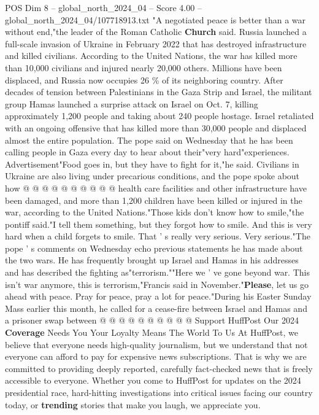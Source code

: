 \begin{textsample}{POS Dim 8 – global\_north\_2024\_04 – Score 4.00 – global\_north\_2024\_04/107718913.txt}  \label{ex:f8_pos_312}
"A negotiated peace is better than a war without end,"the leader of the Roman Catholic \textbf{Church} said.
Russia launched a full-scale invasion of Ukraine in February 2022 that has destroyed infrastructure and killed civilians.
According to the United Nations, the war has killed more than 10,000 civilians and injured nearly 20,000 others.
Millions have been displaced, and Russia now occupies 26 \% of its neighboring country.
After decades of tension between Palestinians in the Gaza Strip and Israel, the militant group Hamas launched a surprise attack on Israel on Oct. 7, killing approximately 1,200 people and taking about 240 people hostage.
Israel retaliated with an ongoing offensive that has killed more than 30,000 people and displaced almost the entire population.
The pope said on Wednesday that he has been calling people in Gaza every day to hear about their"very hard"experiences.
Advertisement"Food goes in, but they have to fight for it,"he said.
Civilians in Ukraine are also living under precarious conditions, and the pope spoke about how @ @ @ @ @ @ @ @ @ @ health care facilities and other infrastructure have been damaged, and more than 1,200 children have been killed or injured in the war, according to the United Nations."Those kids don't know how to smile,"the pontiff said."I tell them something, but they forgot how to smile.
And this is very hard when a child forgets to smile.
That ' s really very serious.
Very serious."The pope ' s comments on Wednesday echo previous statements he has made about the two wars.
He has frequently brought up Israel and Hamas in his addresses and has described the fighting as"terrorism.""Here we ' ve gone beyond war.
This isn't war anymore, this is terrorism,"Francis said in November."\textbf{Please}, let us go ahead with peace.
Pray for peace, pray a lot for peace."During his Easter Sunday Mass earlier this month, he called for a cease-fire between Israel and Hamas and a prisoner swap between @ @ @ @ @ @ @ @ @ @ Support HuffPost Our 2024 \textbf{Coverage} Needs You Your Loyalty Means The World To Us At HuffPost, we believe that everyone needs high-quality journalism, but we understand that not everyone can afford to pay for expensive news subscriptions.
That is why we are committed to providing deeply reported, carefully fact-checked news that is freely accessible to everyone.
Whether you come to HuffPost for updates on the 2024 presidential race, hard-hitting investigations into critical issues facing our country today, or \textbf{trending} stories that make you laugh, we appreciate you.

\end{textsample}

